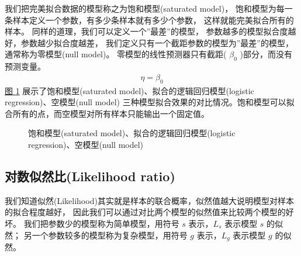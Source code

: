 \documentclass[letterpaper,10pt,english]{sphinxmanual}
\begin{document}
我们把完美拟合数据的模型称之为饱和模型(saturated model)，
饱和模型为每一条样本定义一个参数，有多少条样本就有多少个参数，
这样就能完美拟合所有的样本。
同样的道理，我们可以定义一个”最差”的模型，
参数越多的模型拟合度越好，参数越少拟合度越差，
我们定义只有一个截距参数的模型为”最差”的模型，通常称为零模型(null model)。
零模型的线性预测器只有截距( \(\beta_0\) )部分，而没有预测变量。
\begin{equation}\label{equation:模型评估/content:模型评估/content:4}
\begin{split}\eta = \beta_0\end{split}
\end{equation}
\hyperref[\detokenize{_u6a21_u578b_u8bc4_u4f30/content:fg-me-saturated-0010}]{图 \ref{\detokenize{_u6a21_u578b_u8bc4_u4f30/content:fg-me-saturated-0010}}} 展示了饱和模型(saturated model)、拟合的逻辑回归模型(logistic regression)、空模型(null model)
三种模型拟合效果的对比情况。饱和模型可以拟合所有的点，而空模型对所有样本只能输出一个固定值。

\begin{figure}[htbp]
\centering
\capstart

\noindent{}
\caption{饱和模型(saturated model)、拟合的逻辑回归模型(logistic regression)、空模型(null model)}\label{\detokenize{_u6a21_u578b_u8bc4_u4f30/content:id11}}\label{\detokenize{_u6a21_u578b_u8bc4_u4f30/content:fg-me-saturated-0010}}\end{figure}


\subsection{对数似然比(Likelihood ratio)}
\label{\detokenize{_u6a21_u578b_u8bc4_u4f30/content:likelihood-ratio}}
我们知道似然(Likelihood)其实就是样本的联合概率，似然值越大说明模型对样本的拟合程度越好，
因此我们可以通过对比两个模型的似然值来比较两个模型的好坏。
我们把参数少的模型称为简单模型，用符号 \(s\) 表示，\(L_s\) 表示模型 \(s\) 的似然；
另一个参数较多的模型称为复杂模型，用符号 \(g\) 表示，\(L_g\) 表示模型 \(g\) 的似然。
\end{document}
